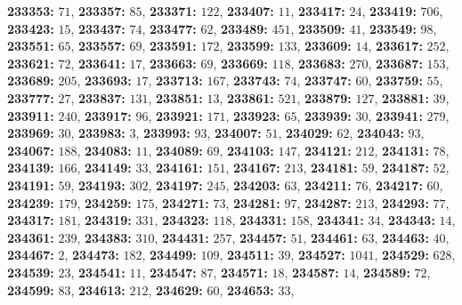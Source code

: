 \textsf{\bfseries 233353:} $71$, \textsf{\bfseries 233357:} $85$, \textsf{\bfseries 233371:} $122$, \textsf{\bfseries 233407:} $11$, \textsf{\bfseries 233417:} $24$, \textsf{\bfseries 233419:} $706$, \textsf{\bfseries 233423:} $15$, \textsf{\bfseries 233437:} $74$, \textsf{\bfseries 233477:} $62$, \textsf{\bfseries 233489:} $451$, \textsf{\bfseries 233509:} $41$, \textsf{\bfseries 233549:} $98$, \textsf{\bfseries 233551:} $65$, \textsf{\bfseries 233557:} $69$, \textsf{\bfseries 233591:} $172$, \textsf{\bfseries 233599:} $133$, \textsf{\bfseries 233609:} $14$, \textsf{\bfseries 233617:} $252$, \textsf{\bfseries 233621:} $72$, \textsf{\bfseries 233641:} $17$, \textsf{\bfseries 233663:} $69$, \textsf{\bfseries 233669:} $118$, \textsf{\bfseries 233683:} $270$, \textsf{\bfseries 233687:} $153$, \textsf{\bfseries 233689:} $205$, \textsf{\bfseries 233693:} $17$, \textsf{\bfseries 233713:} $167$, \textsf{\bfseries 233743:} $74$, \textsf{\bfseries 233747:} $60$, \textsf{\bfseries 233759:} $55$, \textsf{\bfseries 233777:} $27$, \textsf{\bfseries 233837:} $131$, \textsf{\bfseries 233851:} $13$, \textsf{\bfseries 233861:} $521$, \textsf{\bfseries 233879:} $127$, \textsf{\bfseries 233881:} $39$, \textsf{\bfseries 233911:} $240$, \textsf{\bfseries 233917:} $96$, \textsf{\bfseries 233921:} $171$, \textsf{\bfseries 233923:} $65$, \textsf{\bfseries 233939:} $30$, \textsf{\bfseries 233941:} $279$, \textsf{\bfseries 233969:} $30$, \textsf{\bfseries 233983:} $3$, \textsf{\bfseries 233993:} $93$, \textsf{\bfseries 234007:} $51$, \textsf{\bfseries 234029:} $62$, \textsf{\bfseries 234043:} $93$, \textsf{\bfseries 234067:} $188$, \textsf{\bfseries 234083:} $11$, \textsf{\bfseries 234089:} $69$, \textsf{\bfseries 234103:} $147$, \textsf{\bfseries 234121:} $212$, \textsf{\bfseries 234131:} $78$, \textsf{\bfseries 234139:} $166$, \textsf{\bfseries 234149:} $33$, \textsf{\bfseries 234161:} $151$, \textsf{\bfseries 234167:} $213$, \textsf{\bfseries 234181:} $59$, \textsf{\bfseries 234187:} $52$, \textsf{\bfseries 234191:} $59$, \textsf{\bfseries 234193:} $302$, \textsf{\bfseries 234197:} $245$, \textsf{\bfseries 234203:} $63$, \textsf{\bfseries 234211:} $76$, \textsf{\bfseries 234217:} $60$, \textsf{\bfseries 234239:} $179$, \textsf{\bfseries 234259:} $175$, \textsf{\bfseries 234271:} $73$, \textsf{\bfseries 234281:} $97$, \textsf{\bfseries 234287:} $213$, \textsf{\bfseries 234293:} $77$, \textsf{\bfseries 234317:} $181$, \textsf{\bfseries 234319:} $331$, \textsf{\bfseries 234323:} $118$, \textsf{\bfseries 234331:} $158$, \textsf{\bfseries 234341:} $34$, \textsf{\bfseries 234343:} $14$, \textsf{\bfseries 234361:} $239$, \textsf{\bfseries 234383:} $310$, \textsf{\bfseries 234431:} $257$, \textsf{\bfseries 234457:} $51$, \textsf{\bfseries 234461:} $63$, \textsf{\bfseries 234463:} $40$, \textsf{\bfseries 234467:} $2$, \textsf{\bfseries 234473:} $182$, \textsf{\bfseries 234499:} $109$, \textsf{\bfseries 234511:} $39$, \textsf{\bfseries 234527:} $1041$, \textsf{\bfseries 234529:} $628$, \textsf{\bfseries 234539:} $23$, \textsf{\bfseries 234541:} $11$, \textsf{\bfseries 234547:} $87$, \textsf{\bfseries 234571:} $18$, \textsf{\bfseries 234587:} $14$, \textsf{\bfseries 234589:} $72$, \textsf{\bfseries 234599:} $83$, \textsf{\bfseries 234613:} $212$, \textsf{\bfseries 234629:} $60$, \textsf{\bfseries 234653:} $33$, 
